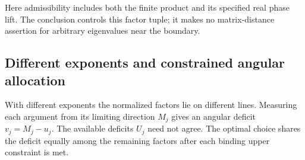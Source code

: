 \documentclass[11pt,a4paper]{article}
\theoremstyle{definition}
\theoremstyle{remark}
\numberwithin{equation}{section}
\begin{document}
Here admissibility includes both the finite product and its specified real
phase lift. The conclusion controls this factor tuple; it makes no
matrix-distance assertion for arbitrary eigenvalues near the boundary.

\subsection{Different exponents and constrained angular allocation}

With different exponents the normalized factors lie on different lines.
Measuring each argument from its limiting direction $M_j$ gives an angular
deficit $v_j=M_j-u_j$. The available deficits $U_j$ need not agree.
The optimal choice shares the deficit equally among the remaining factors
after each binding upper constraint is met.
\end{document}
